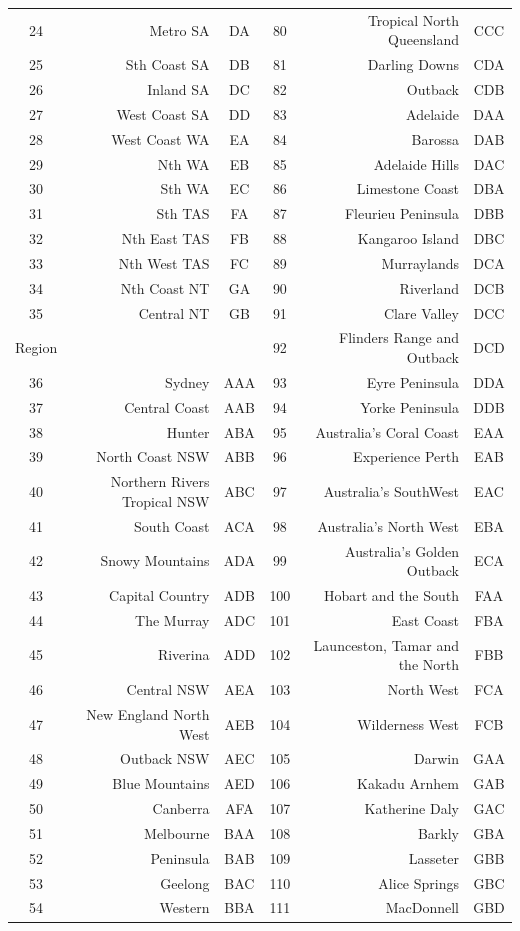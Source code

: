 \documentclass[11pt,a4paper,]{article}
\begin{document}
\begin{table}[t]
\begin{tabular}{crccrc}
24 & Metro SA & DA & 80 & Tropical North Queensland & CCC\\
25 & Sth Coast SA & DB & 81 & Darling Downs & CDA\\
26 & Inland SA & DC & 82 & Outback & CDB\\
27 & West Coast SA & DD & 83 & Adelaide & DAA\\
28 & West Coast WA & EA & 84 & Barossa & DAB\\
29 & Nth WA & EB & 85 & Adelaide Hills & DAC\\
30 & Sth WA & EC & 86 & Limestone Coast & DBA\\
31 & Sth TAS & FA & 87 & Fleurieu Peninsula & DBB\\
32 & Nth East TAS & FB & 88 & Kangaroo Island & DBC\\
33 & Nth West TAS & FC & 89 & Murraylands & DCA\\
34 & Nth Coast NT & GA & 90 & Riverland & DCB\\
35 & Central NT & GB & 91 & Clare Valley & DCC\\
Region &  &  & 92 & Flinders Range and Outback & DCD\\
36 & Sydney & AAA & 93 & Eyre Peninsula & DDA\\
37 & Central Coast & AAB & 94 & Yorke Peninsula & DDB\\
38 & Hunter & ABA & 95 & Australia's Coral Coast & EAA\\
39 & North Coast NSW & ABB & 96 & Experience Perth & EAB\\
40 & Northern Rivers Tropical NSW & ABC & 97 & Australia's SouthWest & EAC\\
41 & South Coast & ACA & 98 & Australia's North West & EBA\\
42 & Snowy Mountains & ADA & 99 & Australia's Golden Outback & ECA\\
43 & Capital Country & ADB & 100 & Hobart and the South & FAA\\
44 & The Murray & ADC & 101 & East Coast & FBA\\
45 & Riverina & ADD & 102 & Launceston, Tamar and the North & FBB\\
46 & Central NSW & AEA & 103 & North West & FCA\\
47 & New England North West & AEB & 104 & Wilderness West & FCB\\
48 & Outback NSW & AEC & 105 & Darwin & GAA\\
49 & Blue Mountains & AED & 106 & Kakadu Arnhem & GAB\\
50 & Canberra & AFA & 107 & Katherine Daly & GAC\\
51 & Melbourne & BAA & 108 & Barkly & GBA\\
52 & Peninsula & BAB & 109 & Lasseter & GBB\\
53 & Geelong & BAC & 110 & Alice Springs & GBC\\
54 & Western & BBA & 111 & MacDonnell & GBD\\
\bottomrule
\end{tabular}
\end{table}
\end{document}
